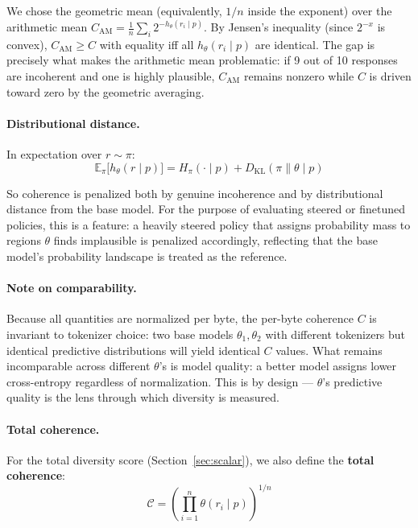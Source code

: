 \documentclass[11pt]{article}
\newcommand{\E}{\mathbb{E}}
\newcommand{\KL}{D_{\mathrm{KL}}}
\begin{document}
We chose the geometric mean (equivalently, $1/n$ inside the exponent) over the arithmetic mean $C_{\mathrm{AM}} = \frac{1}{n}\sum_i 2^{-h_\theta(r_i \mid p)}$. By Jensen's inequality (since $2^{-x}$ is convex), $C_{\mathrm{AM}} \geq C$ with equality iff all $h_\theta(r_i \mid p)$ are identical. The gap is precisely what makes the arithmetic mean problematic: if 9 out of 10 responses are incoherent and one is highly plausible, $C_{\mathrm{AM}}$ remains nonzero while $C$ is driven toward zero by the geometric averaging.

\paragraph{Distributional distance.} In expectation over $r \sim \pi$:
\begin{equation}
    \E_\pi\bigl[h_\theta(r \mid p)\bigr] = H_\pi(\cdot \mid p) + \KL(\pi \| \theta \mid p)
\end{equation}

So coherence is penalized both by genuine incoherence and by distributional distance from the base model. For the purpose of evaluating steered or finetuned policies, this is a feature: a heavily steered policy that assigns probability mass to regions $\theta$ finds implausible is penalized accordingly, reflecting that the base model's probability landscape is treated as the reference.

\paragraph{Note on comparability.} Because all quantities are normalized per byte, the per-byte coherence $C$ is invariant to tokenizer choice: two base models $\theta_1, \theta_2$ with different tokenizers but identical predictive distributions will yield identical $C$ values. What remains incomparable across different $\theta$'s is model quality: a better model assigns lower cross-entropy regardless of normalization. This is by design --- $\theta$'s predictive quality is the lens through which diversity is measured.

\paragraph{Total coherence.} For the total diversity score (Section~\ref{sec:scalar}), we also define the \textbf{total coherence}:
\begin{equation}\label{eq:total-coherence}
    \mathcal{C} = \left(\prod_{i=1}^{n} \theta(r_i \mid p)\right)^{1/n}
\end{equation}
\end{document}
